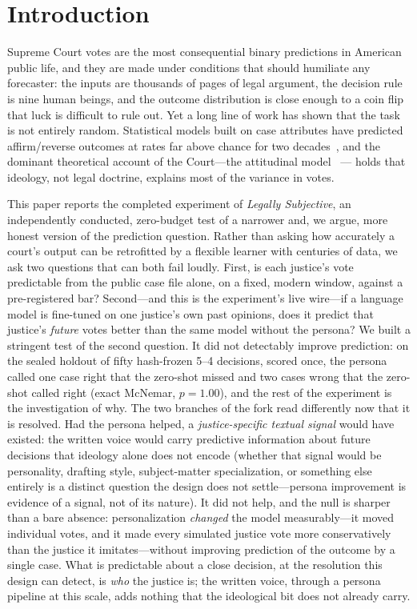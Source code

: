 \section{Introduction}\label{sec:intro}

Supreme Court votes are the most consequential binary predictions in
American public life, and they are made under conditions that should
humiliate any forecaster: the inputs are thousands of pages of legal
argument, the decision rule is nine human beings, and the outcome
distribution is close enough to a coin flip that luck is difficult to
rule out. Yet a long line of work has shown that the task is not
entirely random. Statistical models built on case attributes have
predicted affirm/reverse outcomes at rates far above chance for two
decades~\citep{ruger2004,katz2017}, and the dominant theoretical
account of the Court---the attitudinal model~\citep{segal2002} ---
holds that ideology, not legal doctrine, explains most of the variance
in votes.

This paper reports the completed experiment of \emph{Legally
Subjective}, an independently conducted, zero-budget test of a
narrower and, we argue, more honest version of the prediction
question. Rather than asking how accurately a court's output can be
retrofitted by a flexible learner with centuries of data, we ask two
questions that can both fail loudly. First, is each justice's vote
predictable from the public case file alone, on a fixed, modern
window, against a pre-registered bar? Second---and this is the
experiment's live wire---if a language model is fine-tuned on one
justice's own past opinions, does it predict that justice's
\emph{future} votes better than the same model without the persona?
We built a stringent test of the second question. It did not
detectably improve prediction: on the sealed holdout of fifty hash-frozen 5--4
decisions, scored once, the persona called one case right that the
zero-shot missed and two cases wrong that the zero-shot called right
(exact McNemar, $p=1.00$), and the rest of the experiment is the
investigation of why. The two branches of the fork read differently
now that it is resolved. Had the persona helped, a
\emph{justice-specific textual signal} would have existed: the
written voice would carry predictive information about future
decisions that ideology alone does not encode (whether that signal
would be personality, drafting style, subject-matter specialization,
or something else entirely is a distinct question the design does not
settle---persona improvement is evidence of a signal, not of its
nature). It did not help, and the null is sharper than a bare
absence: personalization \emph{changed} the model
measurably---it moved individual votes, and it made every simulated
justice vote more conservatively than the justice it
imitates---without improving prediction of the outcome by a single
case. What is predictable about a close decision, at the resolution
this design can detect, is \emph{who} the justice is; the written
voice, through a persona pipeline at this scale, adds nothing that
the ideological bit does not already carry.

